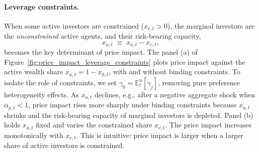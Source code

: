 
\paragraph{Leverage constraints.}
When some active investors are constrained ($x_{c,t}>0$), the marginal investors are the \emph{unconstrained} active agents, and their risk-bearing capacity,
\[
x_{u,t}\;\equiv\;x_{a,t}-x_{c,t},
\]
becomes the key determinant of price impact. The panel (a) of Figure~\ref{fig:price_impact_leverage_constraints} plots price impact against the active wealth share $x_{a,t}=1-x_{0,t}$, with and without binding constraints. To isolate the role of constraints, we set $\gamma_0=\mathbb{E}_t^{u}[\gamma_j]$, removing pure preference heterogeneity effects. As $x_{a,t}$ declines, e.g., after a negative aggregate shock when $\overline{\alpha}_{p,t}<1$, price impact rises more sharply under binding constraints because $x_{u,t}$ shrinks and the risk-bearing capacity of marginal investors is depleted. Panel (b) holds $x_{a,t}$ fixed and varies the constrained share $x_{c,t}$. The price impact increases monotonically with $x_{c,t}$. This is intuitive: price impact is larger when a larger share of active investors is constrained.

